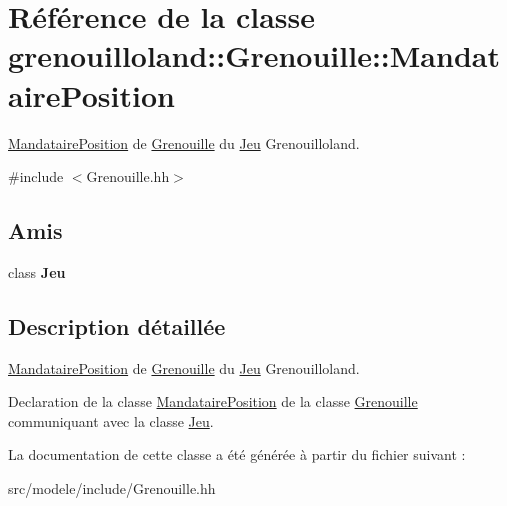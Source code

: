 \hypertarget{classgrenouilloland_1_1Grenouille_1_1MandatairePosition}{\section{Référence de la classe grenouilloland\-:\-:Grenouille\-:\-:Mandataire\-Position}
\label{classgrenouilloland_1_1Grenouille_1_1MandatairePosition}
}


\hyperlink{classgrenouilloland_1_1Grenouille_1_1MandatairePosition}{Mandataire\-Position} de \hyperlink{classgrenouilloland_1_1Grenouille}{Grenouille} du \hyperlink{classgrenouilloland_1_1Jeu}{Jeu} Grenouilloland.  




{\ttfamily \#include $<$Grenouille.\-hh$>$}

\subsection*{Amis}
\begin{DoxyCompactItemize}
\item 
\hypertarget{classgrenouilloland_1_1Grenouille_1_1MandatairePosition_a8347c819d94b3816d06cf9255691923d}{class {\bfseries Jeu}}\label{classgrenouilloland_1_1Grenouille_1_1MandatairePosition_a8347c819d94b3816d06cf9255691923d}

\end{DoxyCompactItemize}


\subsection{Description détaillée}
\hyperlink{classgrenouilloland_1_1Grenouille_1_1MandatairePosition}{Mandataire\-Position} de \hyperlink{classgrenouilloland_1_1Grenouille}{Grenouille} du \hyperlink{classgrenouilloland_1_1Jeu}{Jeu} Grenouilloland. 

Declaration de la classe \hyperlink{classgrenouilloland_1_1Grenouille_1_1MandatairePosition}{Mandataire\-Position} de la classe \hyperlink{classgrenouilloland_1_1Grenouille}{Grenouille} communiquant avec la classe \hyperlink{classgrenouilloland_1_1Jeu}{Jeu}. 

La documentation de cette classe a été générée à partir du fichier suivant \-:\begin{DoxyCompactItemize}
\item 
src/modele/include/Grenouille.\-hh\end{DoxyCompactItemize}
